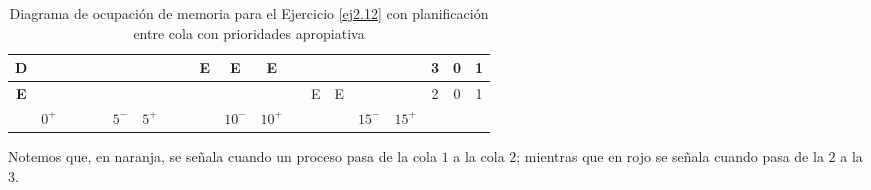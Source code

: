 \begin{ejercicio}
\begin{description}
\begin{table}[H]
\begin{tabular}{ccccccccccccccccc|ccc}
            \multicolumn{1}{c|}{\textbf{D}} &                        &                                &                                &                                &                          &                        &                                &                                & E                              & {\color[HTML]{F56B00} E} & E                       &                                &                                &                                &                         &    & 3          & 0          & 1          \\ \hline
            \multicolumn{1}{c|}{\textbf{E}} &                        &                                &                                &                                &                          &                        &                                &                                &                                &                          &                         &                                & E                              & {\color[HTML]{F56B00} E}       &                         &    & 2          & 0          & 1          \\ \hline
            \multicolumn{1}{c|}{}           & \multicolumn{1}{c|}{$0^+$} & \multicolumn{1}{c|}{\textit{}} & \multicolumn{1}{c|}{\textit{}} & \multicolumn{1}{c|}{\textit{}} & \multicolumn{1}{c|}{$5^-$} & \multicolumn{1}{c|}{$5^+$} & \multicolumn{1}{c|}{\textit{}} & \multicolumn{1}{c|}{\textit{}} & \multicolumn{1}{c|}{\textit{}} & \multicolumn{1}{c|}{$10^-$} & \multicolumn{1}{c|}{$10^+$} & \multicolumn{1}{c|}{\textit{}} & \multicolumn{1}{c|}{\textit{}} & \multicolumn{1}{c|}{\textit{}} & \multicolumn{1}{c|}{$15^-$} & $15^+$ &            &            &           
            \end{tabular}
            \caption{\centering Diagrama de ocupación de memoria para el Ejercicio \ref{ej2.12} con planificación entre cola con prioridades apropiativa}
        \end{table}

        Notemos que, en naranja, se señala cuando un proceso pasa de la cola $1$ a la cola $2$; mientras que en rojo se señala cuando pasa de la $2$ a la $3$.


\end{description}
\end{ejercicio}
